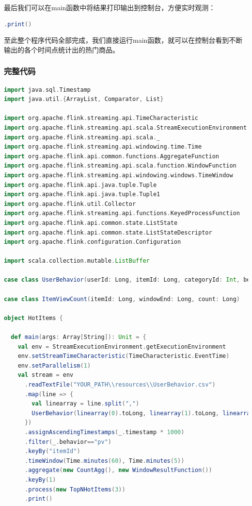 \documentclass[oneside]{ctexbook}
\begin{document}
最后我们可以在main函数中将结果打印输出到控制台，方便实时观测：

\begin{lstlisting}[language=scala]
.print()
\end{lstlisting}

至此整个程序代码全部完成，我们直接运行main函数，就可以在控制台看到不断输出的各个时间点统计出的热门商品。

\subsubsection{完整代码}

\begin{lstlisting}[language=scala]
import java.sql.Timestamp
import java.util.{ArrayList, Comparator, List}

import org.apache.flink.streaming.api.TimeCharacteristic
import org.apache.flink.streaming.api.scala.StreamExecutionEnvironment
import org.apache.flink.streaming.api.scala._
import org.apache.flink.streaming.api.windowing.time.Time
import org.apache.flink.api.common.functions.AggregateFunction
import org.apache.flink.streaming.api.scala.function.WindowFunction
import org.apache.flink.streaming.api.windowing.windows.TimeWindow
import org.apache.flink.api.java.tuple.Tuple
import org.apache.flink.api.java.tuple.Tuple1
import org.apache.flink.util.Collector
import org.apache.flink.streaming.api.functions.KeyedProcessFunction
import org.apache.flink.api.common.state.ListState
import org.apache.flink.api.common.state.ListStateDescriptor
import org.apache.flink.configuration.Configuration

import scala.collection.mutable.ListBuffer

case class UserBehavior(userId: Long, itemId: Long, categoryId: Int, behavior: String, timestamp: Long)

case class ItemViewCount(itemId: Long, windowEnd: Long, count: Long)

object HotItems {

  def main(args: Array[String]): Unit = {
    val env = StreamExecutionEnvironment.getExecutionEnvironment
    env.setStreamTimeCharacteristic(TimeCharacteristic.EventTime)
    env.setParallelism(1)
    val stream = env
      .readTextFile("YOUR_PATH\\resources\\UserBehavior.csv")
      .map(line => {
        val linearray = line.split(",")
        UserBehavior(linearray(0).toLong, linearray(1).toLong, linearray(2).toInt, linearray(3), linearray(4).toLong)
      })
      .assignAscendingTimestamps(_.timestamp * 1000)
      .filter(_.behavior=="pv")
      .keyBy("itemId")
      .timeWindow(Time.minutes(60), Time.minutes(5))
      .aggregate(new CountAgg(), new WindowResultFunction())    
      .keyBy(1)
      .process(new TopNHotItems(3))
      .print()


\end{lstlisting}
\end{document}

